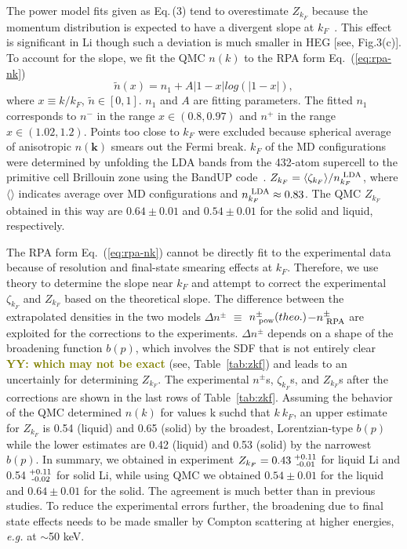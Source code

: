 \documentclass[twocolumn,showpacs,showkeys,fleqn,prl,superscriptaddress]{revtex4}%
\newcommand{\nn}[1]{\textnormal{ #1}}
\newcommand{\yy}[1]{\textcolor{olive}{\textbf{YY: #1}}}
\begin{document}
The power model fits given as Eq.\,(3) tend to overestimate $Z_{k_F}$ because the momentum distribution is expected to have a divergent slope at $k_F$~\cite{gg02}.
This effect is significant in Li though such a deviation is much smaller in HEG [see, Fig.3(c)].
To account for the slope, we fit the QMC $n(k)$ to the RPA form Eq.~(\ref{eq:rpa-nk})
\begin{equation} \label{eq:rpa-nk}
\tilde{n}(x) = n_1 + A\vert 1-x\vert log\left(\vert 1-x\vert\right),
\end{equation}
where $x\equiv k/k_F$, $\tilde{n}\in[0,1]$. $n_1$ and $A$ are fitting parameters. The fitted $n_1$ corresponds to $n^-$ in the range $x\in(0.8, 0.97)$ and $n^+$ in the range $x\in(1.02, 1.2)$. Points too close to $k_F$ were excluded because spherical average of anisotropic $n(\boldsymbol{k})$ smears out the Fermi break. $k_F$ of the MD configurations were determined by unfolding the LDA bands from the 432-atom supercell to the primitive cell Brillouin zone using the BandUP code~\cite{Medeiros2014,Medeiros2015}. $Z_{k_F} = \langle\zeta_{k_F}\rangle/n_{k_F}^{\nn{LDA}}$, where
$\langle\rangle$ indicates average over MD configurations and
$n_{k_F}^\nn{LDA}\approx0.83$. The QMC $Z_{k_F}$ obtained in this way are
$0.64\pm0.01$ and $0.54\pm0.01$
for the solid and liquid, respectively.

The RPA form Eq.~(\ref{eq:rpa-nk}) cannot be directly fit to the experimental data because of resolution and final-state smearing effects at $k_F$.
Therefore, we use theory to determine the slope near $k_F$ and attempt to correct the experimental $\zeta_{k_F}$ and $Z_{k_F}$ based on the theoretical slope.
The difference between the extrapolated densities in the two models $\Delta n^{\pm}$ $\equiv$ $n^{\pm}_{\nn{pow}} (theo.)$$-$$n^{\pm}_{\nn{RPA}}$ are exploited for the corrections to the experiments.
$\Delta n^{\pm}$ depends on a shape of the broadening function $b(p)$, which involves the SDF that is not entirely clear \yy{which may not be exact} (see, Table~\ref{tab:zkf}) and leads to an uncertainly for determining $Z_{k_F}$.
The experimental $n^{\pm}$s, $\zeta_{k_F}$s, and $Z_{k_F}$s after the corrections are shown in the last rows of Table~\ref{tab:zkf}.
Assuming the behavior of the  QMC determined $n(k)$ for values k suchd that $k ~ k_F$, an upper estimate for $Z_{k_F}$ is  0.54 (liquid) and 0.65 (solid) by the broadest, Lorentzian-type $b(p)$ while the lower estimates are 0.42 (liquid) and 0.53 (solid) by the narrowest $b(p)$.
In summary, we obtained in experiment $Z_{k_F}=  0.43^{\nn{+0.11}}_{\nn{\;-0.01}}$ for liquid Li and 0.54$^{\nn{+0.11}}_{\nn{\;-0.02}}$ for solid Li, while using QMC we obtained $0.54\pm0.01$ for the liquid and $0.64\pm0.01$ for the solid.
The agreement is much better than in previous studies.
To reduce the experimental errors further, the broadening due to final state effects needs to be made smaller by Compton scattering at higher energies, {\it{e.g.}} at $\sim$50 keV.
\end{document}
